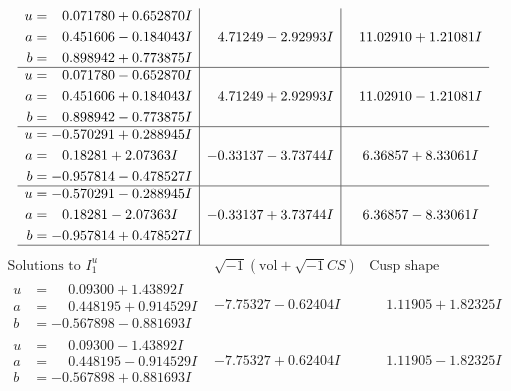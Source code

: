 \documentclass[1p]{elsarticle_modified}
\theoremstyle{definition}
\newcommand{\I}{\sqrt{-1}}
\begin{document}
$$\begin{array}{c|c|c}
\begin{aligned}
u &= \phantom{-}0.071780 + 0.652870 I \\
a &= \phantom{-}0.451606 - 0.184043 I \\
b &= \phantom{-}0.898942 + 0.773875 I\end{aligned}
 & \phantom{-}4.71249 - 2.92993 I & \phantom{-}11.02910 + 1.21081 I \\ \hline\begin{aligned}
u &= \phantom{-}0.071780 - 0.652870 I \\
a &= \phantom{-}0.451606 + 0.184043 I \\
b &= \phantom{-}0.898942 - 0.773875 I\end{aligned}
 & \phantom{-}4.71249 + 2.92993 I & \phantom{-}11.02910 - 1.21081 I \\ \hline\begin{aligned}
u &= -0.570291 + 0.288945 I \\
a &= \phantom{-}0.18281 + 2.07363 I \\
b &= -0.957814 - 0.478527 I\end{aligned}
 & -0.33137 - 3.73744 I & \phantom{-}6.36857 + 8.33061 I \\ \hline\begin{aligned}
u &= -0.570291 - 0.288945 I \\
a &= \phantom{-}0.18281 - 2.07363 I \\
b &= -0.957814 + 0.478527 I\end{aligned}
 & -0.33137 + 3.73744 I & \phantom{-}6.36857 - 8.33061 I\\
 \hline 
 \end{array}$$\newpage$$\begin{array}{c|c|c}  
\text{Solutions to }I^u_{1}& \I (\text{vol} + \sqrt{-1}CS) & \text{Cusp shape}\\
 \hline 
\begin{aligned}
u &= \phantom{-}0.09300 + 1.43892 I \\
a &= \phantom{-}0.448195 + 0.914529 I \\
b &= -0.567898 - 0.881693 I\end{aligned}
 & -7.75327 - 0.62404 I & \phantom{-}1.11905 + 1.82325 I \\ \hline\begin{aligned}
u &= \phantom{-}0.09300 - 1.43892 I \\
a &= \phantom{-}0.448195 - 0.914529 I \\
b &= -0.567898 + 0.881693 I\end{aligned}
 & -7.75327 + 0.62404 I & \phantom{-}1.11905 - 1.82325 I \\ \hline\begin{aligned}

\end{aligned}
\end{array}$$
\end{document}
